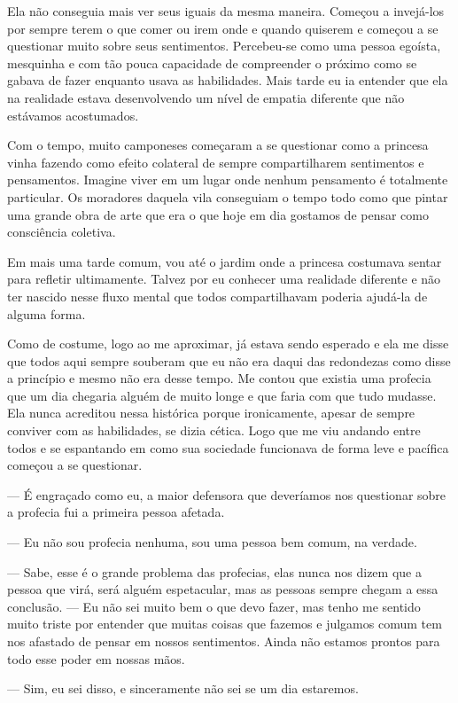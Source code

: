 Ela não conseguia mais ver seus iguais da mesma maneira. Começou a invejá-los por sempre terem o que comer ou irem onde e quando quiserem e começou a se questionar muito sobre seus sentimentos. Percebeu-se como uma pessoa egoísta, mesquinha e com tão pouca capacidade de compreender o próximo como se gabava de fazer enquanto usava as habilidades. Mais tarde eu ia entender que ela na realidade estava desenvolvendo um nível de empatia diferente que não estávamos acostumados.

Com o tempo, muito camponeses começaram a se questionar como a princesa vinha fazendo como efeito colateral de sempre compartilharem sentimentos e pensamentos. Imagine viver em um lugar onde nenhum pensamento é totalmente particular. Os moradores daquela vila conseguiam o tempo todo como que pintar uma grande obra de arte que era o que hoje em dia gostamos de pensar como consciência coletiva.

Em mais uma tarde comum, vou até o jardim onde a princesa costumava sentar para refletir ultimamente. Talvez por eu conhecer uma realidade diferente e não ter nascido nesse fluxo mental que todos compartilhavam poderia ajudá-la de alguma forma.

Como de costume, logo ao me aproximar, já estava sendo esperado e ela me disse que todos aqui sempre souberam que eu não era daqui das redondezas como disse a princípio e mesmo não era desse tempo. Me contou que existia uma profecia que um dia chegaria alguém de muito longe e que faria com que tudo mudasse. Ela nunca acreditou nessa histórica porque ironicamente, apesar de sempre conviver com as habilidades, se dizia cética. Logo que me viu andando entre todos e se espantando em como sua sociedade funcionava de forma leve e pacífica começou a se questionar.

— É engraçado como eu, a maior defensora que deveríamos nos questionar sobre a profecia fui a primeira pessoa afetada.

— Eu não sou profecia nenhuma, sou uma pessoa bem comum, na verdade.

— Sabe, esse é o grande problema das profecias, elas nunca nos dizem que a pessoa que virá, será alguém espetacular, mas as pessoas sempre chegam a essa conclusão. — Eu não sei muito bem o que devo fazer, mas tenho me sentido muito triste por entender que muitas coisas que fazemos e julgamos comum tem nos afastado de pensar em nossos sentimentos. Ainda não estamos prontos para todo esse poder em nossas mãos.

— Sim, eu sei disso, e sinceramente não sei se um dia estaremos.

